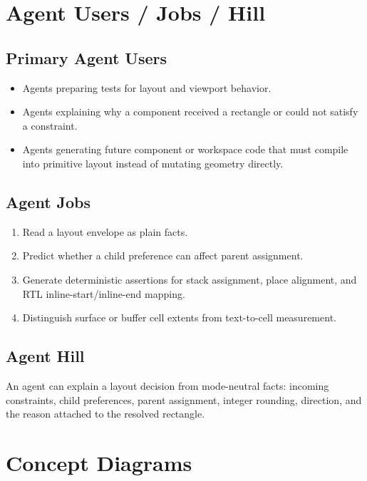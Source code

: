 \section{Agent Users / Jobs / Hill}\label{record-163-agent-users-jobs-hill}

\subsection{Primary Agent Users}\label{record-163-primary-agent-users}

\begin{itemize}
\tightlist
\item
  Agents preparing tests for layout and viewport behavior.
\item
  Agents explaining why a component received a rectangle or could not satisfy a constraint.
\item
  Agents generating future component or workspace code that must compile into primitive layout instead of mutating geometry directly.
\end{itemize}

\subsection{Agent Jobs}\label{record-163-agent-jobs}

\begin{enumerate}
\def\labelenumi{\arabic{enumi}.}
\tightlist
\item
  Read a layout envelope as plain facts.
\item
  Predict whether a child preference can affect parent assignment.
\item
  Generate deterministic assertions for stack assignment, place alignment, and RTL inline-start/inline-end mapping.
\item
  Distinguish surface or buffer cell extents from text-to-cell measurement.
\end{enumerate}

\subsection{Agent Hill}\label{record-163-agent-hill}

An agent can explain a layout decision from mode-neutral facts: incoming constraints, child preferences, parent assignment, integer rounding, direction, and the reason attached to the resolved rectangle.

\section{Concept Diagrams}\label{record-163-concept-diagrams}

